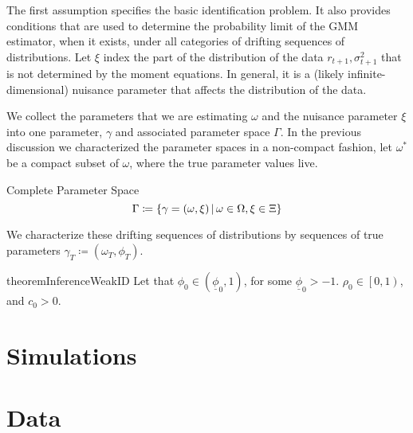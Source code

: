 \documentclass[11pt, letterpaper, twoside, final]{article}
\begin{document}
The first assumption specifies the basic identification
problem. It also provides conditions that are used to determine the
probability limit of the GMM estimator, when it exists, under all categories
of drifting sequences of distributions.
Let $\xi$ index the part of the distribution of the data $r_{t+1}, \sigma^2_{t+1}$ that is not determined by the
moment equations.
In general, it is a (likely infinite-dimensional) nuisance parameter that affects the distribution of the data. 


We collect the parameters that we are estimating $\omega$ and the nuisance parameter $\xi$ into one parameter,
$\gamma$ and associated parameter space $\Gamma$.
In the previous discussion we characterized the parameter spaces in a non-compact fashion, let $\omega^{*}$ be a
compact subset of $\omega$, where the true parameter values live.

\begin{defn}{Complete Parameter Space}
    \begin{equation}
        \Gamma \coloneqq \left\lbrace \gamma = (\omega, \xi) \,\middle\vert\, \omega \in \Omega, \xi \in \Xi \right\rbrace 
    \end{equation}
\end{defn}

We characterize these drifting sequences of distributions by sequences of true parameters $\gamma_T \coloneqq
(\omega_T, \phi_T)$.



\begin{restatable}{theorem}{InferenceWeakID}
    Let that $\phi_0  \in \left(\underline{\phi}_0,1\right)$, for some $\underline{\phi}_0 > -1$. 
    $\rho_0 \in \left[0,1\right)$, and $c_0 > 0$. 

\end{restatable}


\section{Simulations}

\section{Data}\label{sec:data}
\end{document}
